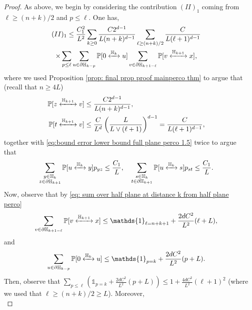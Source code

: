 \documentclass[11pt,a4paper]{article}
\numberwithin{equation}{section}
\theoremstyle{plain}
\theoremstyle{definition}
\newcommand{\connect}{\xleftrightarrow}
\begin{document}
\begin{proof}
As above, we begin by considering the contribution $(II)_1$ coming from $\ell \geq (n+k)/2$ and $p\leq \ell$. One has,
\begin{multline}\label{eq:bound error lower bound full plane perco 6}
	(II)_1\leq \frac{C_1^2}{L^2}\sum_{k\geq 0}\frac{C2^{d-1}}{L(n+k)^{d-1}}\sum_{\ell\geq (n+k)/2}\frac{C}{L(\ell+1)^{d-1}}\\\times\sum_{p\leq \ell}\sum_{u\in \partial \mathbb H_{k-p}}\mathbb P[0\connect{\mathbb H_k\:}u]\sum_{v\in \partial\mathbb H_{k+1-\ell}}\mathbb P[v\connect{\mathbb H_{k+1}\:}x],
\end{multline}
where we used Proposition \ref{prop: final prop proof mainperco thm} to argue that (recall that $n\geq 4L$)
\begin{align}
	\mathbb P[z\connect{\mathbb H_{k+1}\:}v]&\leq \frac{C2^{d-1}}{L(n+k)^{d-1}}, \\
	\mathbb P[t\connect{\mathbb H_{k+1}\:}v]&\leq \frac{C}{L^d}\left(\frac{L}{L\vee (\ell +1)}\right)^{d-1}=\frac{C}{L(\ell+1)^{d-1}},
\end{align}
 together with \eqref{eq:bound error lower bound full plane perco 1.5} twice to argue that 
 \begin{equation}\label{eq:bound error lower bound full bonus 1}
 	\sum_{\substack{y\in \mathbb H_k\\z\in \partial\mathbb H_{k+1}}}\mathbb P[u\connect{\mathbb H_k\:}y]p_{yz}\leq \frac{C_1}{L}, \quad \sum_{\substack{s\in \mathbb H_k\\t\in \partial\mathbb H_{k+1}}}\mathbb P[u\connect{\mathbb H_k\:}s]p_{st}\leq \frac{C_1}{L}.
 \end{equation}
Now, observe that by \eqref{eq: sum over half plane at distance k from half plane perco}
\begin{equation}\label{eq:bound error lower bound full plane perco 7}
	\sum_{v\in \partial \mathbb H_{k+1-\ell}}\mathbb P[v\connect{\mathbb H_{k+1}\:}x]\leq \mathds{1}_{\ell=n+k+1}+\frac{2dC^2}{L^2}(\ell+L),
\end{equation}
and 
\begin{equation}\label{eq:bound error lower bound full plane perco 8}
	\sum_{u\in \partial \mathbb H_{k-p}}\mathbb P[0\connect{\mathbb H_k\:}u]\leq \mathds{1}_{p=k}+\frac{2dC^2}{L^2}(p+L).
\end{equation}
Then, observe that $\sum_{p\leq \ell}\left(\mathds{1}_{p=k}+\frac{2dC^2}{L^2}(p+L)\right)\leq 1+\frac{4dC^2}{L^2}(\ell+1)^2$ (where we used that $\ell\geq (n+k)/2\geq L$). Moreover,
\begin{equation}

\end{equation}
\end{proof}
\end{document}

